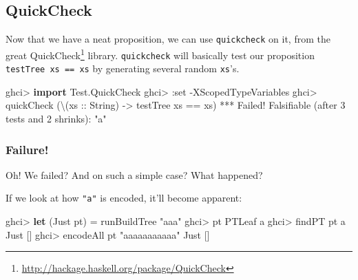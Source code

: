 \documentclass[]{article}
\newenvironment{Shaded}{}{}
\newcommand{\CharTok}[1]{\textcolor[rgb]{0.25,0.44,0.63}{#1}}
\newcommand{\DataTypeTok}[1]{\textcolor[rgb]{0.56,0.13,0.00}{#1}}
\newcommand{\DecValTok}[1]{\textcolor[rgb]{0.25,0.63,0.44}{#1}}
\newcommand{\FunctionTok}[1]{\textcolor[rgb]{0.02,0.16,0.49}{#1}}
\newcommand{\KeywordTok}[1]{\textcolor[rgb]{0.00,0.44,0.13}{\textbf{#1}}}
\newcommand{\NormalTok}[1]{#1}
\newcommand{\OperatorTok}[1]{\textcolor[rgb]{0.40,0.40,0.40}{#1}}
\newcommand{\OtherTok}[1]{\textcolor[rgb]{0.00,0.44,0.13}{#1}}
\newcommand{\StringTok}[1]{\textcolor[rgb]{0.25,0.44,0.63}{#1}}
\renewcommand{\href}[2]{#2\footnote{\url{#1}}}
\begin{document}
\subsection{QuickCheck}\label{quickcheck}

Now that we have a neat proposition, we can use \texttt{quickcheck} on it, from
the great \href{http://hackage.haskell.org/package/QuickCheck}{QuickCheck}
library. \texttt{quickcheck} will basically test our proposition
\texttt{testTree\ xs\ ==\ xs} by generating several random \texttt{xs}'s.

\begin{Shaded}
\begin{Highlighting}[]
\NormalTok{ghci}\OperatorTok{\textgreater{}} \KeywordTok{import} \DataTypeTok{Test.QuickCheck}
\NormalTok{ghci}\OperatorTok{\textgreater{}} \OperatorTok{:}\NormalTok{set }\OperatorTok{{-}}\DataTypeTok{XScopedTypeVariables}
\NormalTok{ghci}\OperatorTok{\textgreater{}}\NormalTok{ quickCheck (\textbackslash{}(}\OtherTok{xs ::} \DataTypeTok{String}\NormalTok{) }\OtherTok{{-}\textgreater{}}\NormalTok{ testTree xs }\OperatorTok{==}\NormalTok{ xs)}
\OperatorTok{***} \DataTypeTok{Failed}\OperatorTok{!} \DataTypeTok{Falsifiable}\NormalTok{ (after }\DecValTok{3}\NormalTok{ tests }\FunctionTok{and} \DecValTok{2}\NormalTok{ shrinks)}\OperatorTok{:}
\StringTok{"a"}
\end{Highlighting}
\end{Shaded}

\subsubsection{Failure!}\label{failure}

Oh! We failed? And on such a simple case? What happened?

If we look at how \texttt{"a"} is encoded, it'll become apparent:

\begin{Shaded}
\begin{Highlighting}[]
\NormalTok{ghci}\OperatorTok{\textgreater{}} \KeywordTok{let}\NormalTok{ (}\DataTypeTok{Just}\NormalTok{ pt) }\OtherTok{=}\NormalTok{ runBuildTree }\StringTok{"aaa"}
\NormalTok{ghci}\OperatorTok{\textgreater{}}\NormalTok{ pt}
\DataTypeTok{PTLeaf} \CharTok{\textquotesingle{}a\textquotesingle{}}
\NormalTok{ghci}\OperatorTok{\textgreater{}}\NormalTok{ findPT pt }\CharTok{\textquotesingle{}a\textquotesingle{}}
\DataTypeTok{Just}\NormalTok{ []}
\NormalTok{ghci}\OperatorTok{\textgreater{}}\NormalTok{ encodeAll pt }\StringTok{"aaaaaaaaaaa"}
\DataTypeTok{Just}\NormalTok{ []}
\end{Highlighting}
\end{Shaded}
\end{document}
